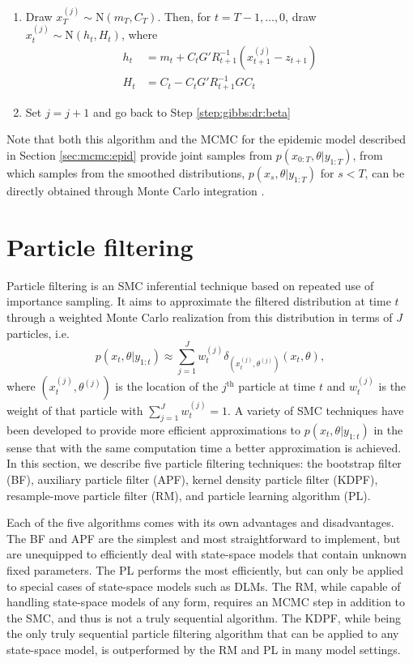 \begin{enumerate}
\begin{enumerate}
\item Draw $x_T^{(j)} \sim \mbox{N}(m_T,C_T)$. Then, for $t = T-1,\ldots,0$, draw $x_t^{(j)} \sim \mbox{N}(h_t,H_t)$, where
    \begin{align*}
    h_t &= m_t + C_tG'R_{t+1}^{-1}(x_{t+1}^{(j)} - z_{t+1}) \\
    H_t &= C_t - C_tG'R_{t+1}^{-1}GC_t
    \end{align*}
\item Set $j = j + 1$ and go back to Step \ref{step:gibbs:dr:beta}
\end{enumerate}
\end{enumerate}
Note that both this algorithm and the MCMC for the epidemic model described in Section \ref{sec:mcmc:epid} provide joint samples from $p(x_{0:T},\theta|y_{1:T})$, from which samples from the smoothed distributions, $p(x_s,\theta|y_{1:T})$ for $s < T$, can be directly obtained through Monte Carlo integration \cite[Chapter 3][]{Robe:Case:mont:2004}.

\section{Particle filtering \label{sec:filtering}}

Particle filtering is an SMC inferential technique based on repeated use of importance sampling. It aims to approximate the filtered distribution at time $t$ through a weighted Monte Carlo realization from this distribution in terms of $J$ particles, i.e.
\begin{equation}
p(x_t,\theta| y_{1:t}) \approx \sum_{j=1}^J w_t^{(j)} \delta_{\left(x_t^{(j)},\theta^{(j)}\right)}(x_t,\theta), \label{eqn:approx}
\end{equation}
where $\left(x_t^{(j)},\theta^{(j)}\right)$ is the location of the $j^{\mbox{th}}$ particle at time $t$ and $w_t^{(j)}$ is the weight of that particle with $\sum_{j=1}^J w_t^{(j)}=1$. A variety of SMC techniques have been developed to provide more efficient approximations to $p(x_t,\theta|y_{1:t})$ in the sense that with the same computation time a better approximation is achieved. In this section, we describe five particle filtering techniques: the bootstrap filter (BF), auxiliary particle filter (APF), kernel density particle filter (KDPF), resample-move particle filter (RM), and particle learning algorithm (PL).

Each of the five algorithms comes with its own advantages and disadvantages. The BF and APF are the simplest and most straightforward to implement, but are unequipped to efficiently deal with state-space models that contain unknown fixed parameters. The PL performs the most efficiently, but can only be applied to special cases of state-space models such as DLMs. The RM, while capable of handling state-space models of any form, requires an MCMC step in addition to the SMC, and thus is not a truly sequential algorithm. The KDPF, while being the only truly sequential particle filtering algorithm that can be applied to any state-space model, is outperformed by the RM and PL in many model settings.

